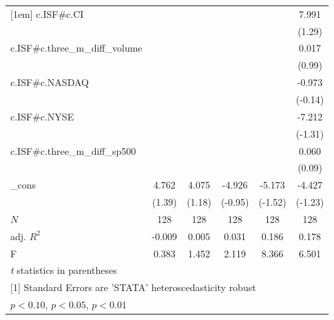 \begin{table}[htbp]
\begin{tabular}{l*{5}{c}}
[1em]
c.ISF#c.CI  &                     &                     &                     &                     &       7.991         \\
            &                     &                     &                     &                     &      (1.29)         \\
[1em]
c.ISF#c.three\_m\_diff\_volume&                     &                     &                     &                     &       0.017         \\
            &                     &                     &                     &                     &      (0.99)         \\
[1em]
c.ISF#c.NASDAQ&                     &                     &                     &                     &      -0.973         \\
            &                     &                     &                     &                     &     (-0.14)         \\
[1em]
c.ISF#c.NYSE&                     &                     &                     &                     &      -7.212         \\
            &                     &                     &                     &                     &     (-1.31)         \\
[1em]
c.ISF#c.three\_m\_diff\_sp500&                     &                     &                     &                     &       0.060         \\
            &                     &                     &                     &                     &      (0.09)         \\
[1em]
\_cons      &       4.762         &       4.075         &      -4.926         &      -5.173         &      -4.427         \\
            &      (1.39)         &      (1.18)         &     (-0.95)         &     (-1.52)         &     (-1.23)         \\
\hline
\(N\)       &         128         &         128         &         128         &         128         &         128         \\
adj. \(R^{2}\)&      -0.009         &       0.005         &       0.031         &       0.186         &       0.178         \\
F           &       0.383         &       1.452         &       2.119         &       8.366         &       6.501         \\
\hline\hline
\multicolumn{6}{l}{\footnotesize \textit{t} statistics in parentheses}\\
\multicolumn{6}{l}{\footnotesize [1] Standard Errors are 'STATA' heteroscedasticity robust}\\
\multicolumn{6}{l}{\footnotesize \sym{*} \(p<0.10\), \sym{**} \(p<0.05\), \sym{***} \(p<0.01\)}\\
\end{tabular}
\end{table}
